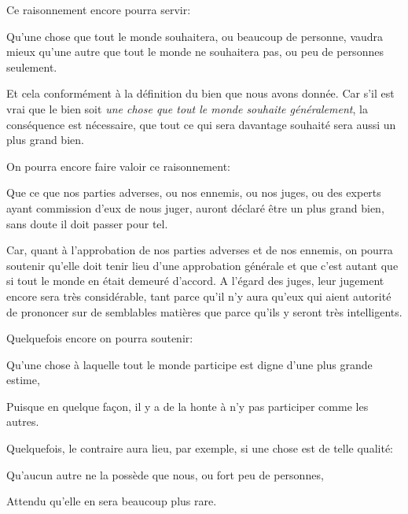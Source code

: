 Ce raisonnement encore pourra servir:

\begin{emphpar}
    Qu'une chose que tout le monde souhaitera, ou beaucoup de personne, vaudra mieux qu'une autre que tout le monde ne
	souhaitera pas, ou peu de personnes seulement.
\end{emphpar}

Et cela conformément à la définition du bien que nous avons donnée. Car s'il est vrai que le bien soit \emph{une chose
que tout le monde souhaite généralement}, la conséquence est nécessaire, que tout ce qui sera davantage souhaité sera
aussi un plus grand bien.

\bigbreak

On pourra encore faire valoir ce raisonnement:

\begin{emphpar}
    Que ce que nos parties adverses, ou nos ennemis, ou nos juges, ou des experts ayant commission d'eux de nous juger,
	auront déclaré être un plus grand bien, sans doute il doit passer pour tel.
\end{emphpar}

Car, quant à l'approbation de nos parties adverses et de nos ennemis, on pourra soutenir qu'elle doit tenir lieu d'une
approbation générale et que c'est autant que si tout le monde en était demeuré d'accord. A l'égard des juges, leur jugement
encore sera très considérable, tant parce qu'il n'y aura qu'eux qui aient autorité de prononcer sur de semblables matières
que parce qu'ils y seront très intelligents.

\bigbreak

Quelquefois encore on pourra soutenir:

\begin{emphpar}
    Qu'une chose à laquelle tout le monde participe est digne d'une plus grande estime,
\end{emphpar}

Puisque en quelque façon, il y a de la honte à n'y pas participer comme les autres.

Quelquefois, le contraire aura lieu, par exemple, si une chose est de telle qualité:

\begin{emphpar}
    Qu'aucun autre ne la possède que nous, ou fort peu de personnes,
\end{emphpar}

Attendu qu'elle en sera beaucoup plus rare.

\bigbreak

